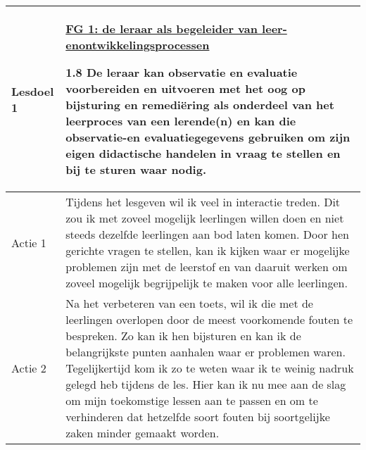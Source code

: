 \documentclass[a4paper,12pt,twoside]{article}%
\begin{document}
\begin{tabularx}{\textwidth}{|p{}|p{}|}
	\hline
	\textbf{Lesdoel 1} & 
	\underline{FG 1: de leraar als begeleider van leer- en}\newline \underline{ontwikkelingsprocessen}\newline
	
	1.8 De leraar kan observatie en evaluatie voorbereiden en uitvoeren met het oog op bijsturing en remediëring als onderdeel van het leerproces van een lerende(n) en kan die observatie-en evaluatiegegevens gebruiken om zijn eigen didactische handelen in vraag te stellen en bij te sturen waar nodig.\\ \hline
	Actie 1 & Tijdens het lesgeven wil ik veel in interactie treden. Dit zou ik met zoveel mogelijk leerlingen willen doen en niet steeds dezelfde leerlingen aan bod laten komen. Door hen gerichte vragen te stellen, kan ik kijken waar er mogelijke problemen zijn met de leerstof en van daaruit werken om zoveel mogelijk begrijpelijk te maken voor alle leerlingen. \\ \hline
	Actie 2 & Na het verbeteren van een toets, wil ik die met de leerlingen overlopen door de meest voorkomende fouten te bespreken. Zo kan ik hen bijsturen en kan ik de belangrijkste punten aanhalen waar er problemen waren. Tegelijkertijd kom ik zo te weten waar ik te weinig nadruk gelegd heb tijdens de les. Hier kan ik nu mee aan de slag om mijn toekomstige lessen aan te passen en om te verhinderen dat hetzelfde soort fouten bij soortgelijke zaken minder gemaakt worden. \\ \hline
\end{tabularx}
\end{document}
